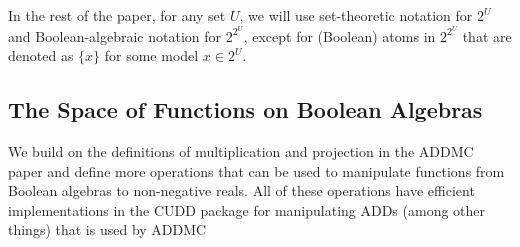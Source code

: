 \documentclass{article}
\theoremstyle{definition}
\theoremstyle{remark}
\begin{document}
In the rest of the paper, for any set $U$, we will use set-theoretic notation
for $2^U$ and Boolean-algebraic notation for $2^{2^U}$, except for (Boolean)
atoms in $2^{2^U}$ that are denoted as $\{x\}$ for some model $x \in 2^U$.

\subsection{The Space of Functions on Boolean Algebras}

We build on the definitions of multiplication and projection in the ADDMC paper
\cite{DBLP:conf/aaai/DudekPV20} and define more operations that can be used to
manipulate functions from Boolean algebras to non-negative reals. All of these
operations have efficient implementations in the CUDD \cite{somenzi1998cudd}
package for manipulating ADDs (among other things) that is used by ADDMC
\end{document}
